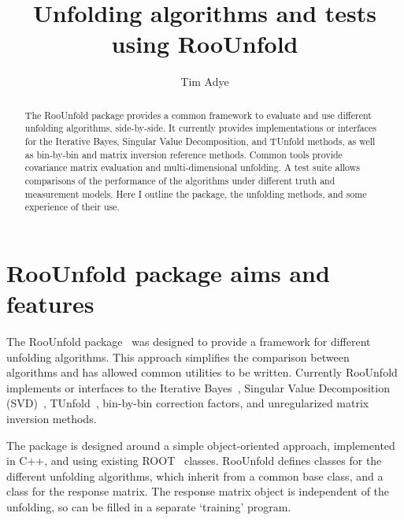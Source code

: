 \documentclass{cernrep}
\title{Unfolding algorithms and tests using RooUnfold}
\author{Tim Adye}
\institute{Particle Physics Department, Rutherford Appleton Laboratory, Didcot, United Kingdom.}
\begin{document}
\maketitle

\begin{abstract}
The RooUnfold package provides a common framework to evaluate and use
different unfolding algorithms, side-by-side. It currently provides
implementations or interfaces for the Iterative Bayes, Singular Value Decomposition, and
TUnfold methods, as well as bin-by-bin and matrix inversion reference
methods. Common tools provide covariance matrix evaluation and
multi-dimensional unfolding. A test suite allows comparisons of the
performance of the algorithms under different truth and measurement models.
Here I outline the package, the unfolding methods, and some experience of their use.
\end{abstract}

\section{RooUnfold package aims and features}

The RooUnfold package~\cite{RooUnfold-web} was designed to provide a framework for different unfolding algorithms.
This approach simplifies the comparison between algorithms and has allowed
common utilities to be written.
Currently RooUnfold implements or interfaces to the Iterative Bayes~\cite{D'Agostini:1994zf,Bierwagen:PHYSTAT2011},
Singular Value Decomposition (SVD)~\cite{Hocker:1995kb,Kartvelishvili:PHYSTAT2011,Tackmann:PHYSTAT2011},
TUnfold~\cite{Schmitt-web}, bin-by-bin correction factors, and unregularized matrix inversion methods.

The package is designed around a simple object-oriented approach, implemented in
C++, and using existing ROOT~\cite{Brun:1997pa} classes. RooUnfold defines classes for the different
unfolding algorithms, which inherit from a common base class, and a class for
the response matrix. The response matrix object is independent of the unfolding,
so can be filled in a separate `training' program.
\end{document}
